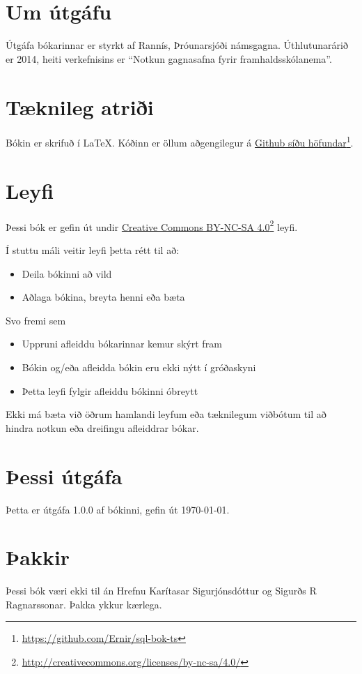 \section{Um útgáfu}
Útgáfa bókarinnar er styrkt af Rannís, Þróunarsjóði námsgagna. Úthlutunarárið er 2014, heiti verkefnisins er ``Notkun gagnasafna fyrir framhaldsskólanema''.
\section{Tæknileg atriði}
Bókin er skrifuð í \LaTeX. Kóðinn er öllum aðgengilegur á \href{https://github.com/Ernir/sql-bok-ts}{Github síðu höfundar}\footnote{\url{https://github.com/Ernir/sql-bok-ts}}.
\section{Leyfi}
Þessi bók er gefin út undir \href{http://creativecommons.org/licenses/by-nc-sa/4.0/}{Creative Commons BY-NC-SA 4.0}\footnote{\url{http://creativecommons.org/licenses/by-nc-sa/4.0/}} leyfi. 

Í stuttu máli veitir leyfi þetta rétt til að:
\begin{itemize}
 \item Deila bókinni að vild
 \item Aðlaga bókina, breyta henni eða bæta
\end{itemize}
Svo fremi sem
\begin{itemize}
 \item Uppruni afleiddu bókarinnar kemur skýrt fram
 \item Bókin og/eða afleidda bókin eru ekki nýtt í gróðaskyni
 \item Þetta leyfi fylgir afleiddu bókinni óbreytt
\end{itemize}
Ekki má bæta við öðrum hamlandi leyfum eða tæknilegum viðbótum til að hindra notkun eða dreifingu afleiddrar bókar.

\section{Þessi útgáfa}
Þetta er útgáfa 1.0.0 af bókinni, gefin út \today.

\section{Þakkir}
Þessi bók væri ekki til án Hrefnu Karítasar Sigurjónsdóttur og Sigurðs R Ragnarssonar. Þakka ykkur kærlega.